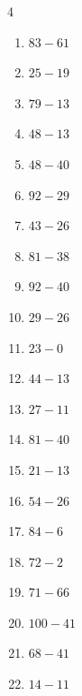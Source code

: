\begin{multicols}{4}
\begin{enumerate}
  \item $83-61$
        \phantom{$=22$}

  \item $25-19$
        \phantom{$=6$}

  \item $79-13$
        \phantom{$=66$}

  \item $48-13$
        \phantom{$=35$}

  \item $48-40$
        \phantom{$=8$}

\columnbreak %

  \item $92-29$
        \phantom{$=63$}

  \item $43-26$
        \phantom{$=17$}

  \item $81-38$
        \phantom{$=43$}

  \item $92-40$
        \phantom{$=52$}

  \item $29-26$
        \phantom{$=3$}

  \item $23-0$
        \phantom{$=23$}

  \item $44-13$
        \phantom{$=31$}

  \item $27-11$
        \phantom{$=16$}

  \item $81-40$
        \phantom{$=41$}

  \item $21-13$
        \phantom{$=8$}

  \item $54-26$
        \phantom{$=28$}

  \item $84-6$
        \phantom{$=78$}

  \item $72-2$
        \phantom{$=70$}

  \item $71-66$
        \phantom{$=5$}

  \item $100-41$
        \phantom{$=59$}

  \item $68-41$
        \phantom{$=27$}

  \item $14-11$
        \phantom{$=3$}


\end{enumerate}
\end{multicols}
